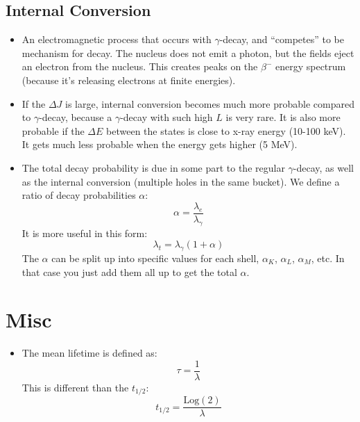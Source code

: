\documentclass[letter]{article}
\begin{document}
\subsection{Internal Conversion}

\begin{itemize}
\item An electromagnetic process that occurs with $\gamma$-decay, and
  ``competes'' to be mechanism for decay. The nucleus does not emit a
  photon, but the fields eject an electron from the
  nucleus. This creates peaks on the $\beta^-$ energy spectrum
  (because it's releasing electrons at finite energies).~\cite[pp. 341]{lecture}
\item If the $\Delta{}J$ is large, internal conversion
  becomes much more probable compared to $\gamma$-decay, because a
  $\gamma$-decay with such high $L$ is very rare. It is also more
  probable if the $\Delta{}E$ between the states is close to x-ray
  energy (10-100 keV). It gets much less probable when the energy gets
  higher (5 MeV).
\item The total decay probability is due in some part to the regular
  $\gamma$-decay, as well as the internal conversion (multiple holes
  in the same bucket). We define a ratio of decay probabilities $\alpha$:
  \begin{equation*}
    \alpha = \frac{\lambda_e}{\lambda_\gamma}
  \end{equation*}
It is more useful in this form:
\begin{equation*}
  \lambda_t = \lambda_\gamma(1+\alpha)
\end{equation*}
The $\alpha$ can be split up into specific values for each shell,
$\alpha_K$, $\alpha_L$, $\alpha_M$, etc. In that case you just add
them all up to get the total $\alpha$.
\end{itemize}

\section{Misc}

\begin{itemize}
\item The mean lifetime is defined as:
  \begin{equation*}
    \tau = \frac{1}{\lambda}
  \end{equation*}
This is different than the $t_{1/2}$:
\begin{equation*}
  t_{1/2}=\frac{\text{Log}(2)}{\lambda}
\end{equation*}
\end{itemize}



\end{document}
